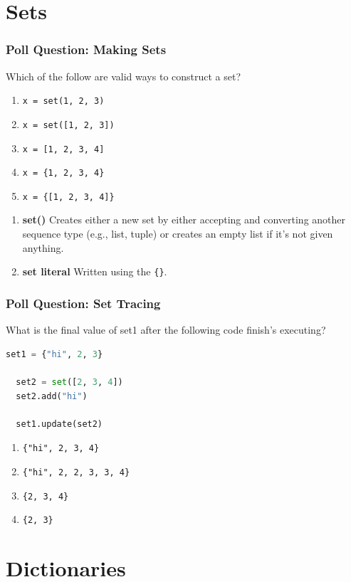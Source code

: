 \documentclass{beamer}
\begin{document}
\section{Sets}

%
%
\begin{frame}[fragile]
  \frametitle{Poll Question: Making Sets}
  Which of the follow are valid ways to construct a set?
  \begin{enumerate}[A] 
    \item \lstinline|x = set(1, 2, 3)| 
    \item \lstinline|x = set([1, 2, 3])| %
    \item \lstinline|x = [1, 2, 3, 4]|
    \item \lstinline|x = {1, 2, 3, 4}| %
    \item \lstinline|x = {[1, 2, 3, 4]}|
  \end{enumerate}
  \pause
  \vfill
  \vfill
  \begin{enumerate}
    \item \textbf{set()} \textrightarrow Creates either a new set by either accepting and converting another sequence type (e.g., list, tuple) or creates an empty list if it's not given anything.
    \item \textbf{set literal} \textrightarrow Written using the \lstinline|{}|.
  \end{enumerate}
\end{frame}


%
%
\begin{frame}[fragile]
  \frametitle{Poll Question: Set Tracing}
  What is the final value of set1 after the following code finish's executing?
  \begin{lstlisting}[language=Python, autogobble]
  set1 = {"hi", 2, 3}

  set2 = set([2, 3, 4])
  set2.add("hi")

  set1.update(set2)
  \end{lstlisting}
  \vfill
  \begin{enumerate}[A] 
      \item \lstinline|{"hi", 2, 3, 4}| %
      \item \lstinline|{"hi", 2, 2, 3, 3, 4}|
      \item \lstinline|{2, 3, 4}|
      \item \lstinline|{2, 3}|
  \end{enumerate}
\end{frame}

\section{Dictionaries}
\end{document}
